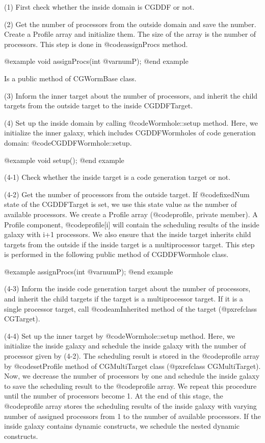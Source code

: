 {(1) First check whether the inside domain is CGDDF or not.

(2) Get the number of processors from the outside domain and save the number.
Create a Profile array and initialize them. The size of the array is the
number of processors. This step is done in @code{assignProcs} method.

@example
void assignProcs(int @var{numP});
@end example

Is a public method of CGWormBase class.

(3) Inform the inner target about the number of processors, and inherit
the child targets from the outside target to the inside CGDDFTarget.

(4) Set up the inside domain by calling @code{Wormhole::setup} method.
Here, we initialize the inner galaxy, which includes CGDDFWormholes of
code generation domain: @code{CGDDFWormhole::setup}.

@example
void setup();
@end example
 
(4-1) Check whether the inside target is a code generation target or not.

(4-2) Get the number of processors from the outside target. If @code{fixedNum}
state of the CGDDFTarget is set, we use this state value as the number of
available processors. We create a Profile array (@code{profile}, private
member). A Profile component, @code{profile[i]} will contain the scheduling
results of the inside galaxy with i+1 processors. We also ensure that
the inside target inherits child targets from the outside if the inside
target is a multiprocessor target. This step is performed in
the following public method of CGDDFWormhole class.

@example
assignProcs(int @var{numP});
@end example

(4-3) Inform the inside code generation target about the number of
processors, and inherit the child targets if the target is a multiprocessor
target. If it is a single processor target, call @code{amInherited} method
of the target (@pxref{class CGTarget}).

(4-4) Set up the inner target by @code{Wormhole::setup} method. Here, we
initialize the inside galaxy and schedule the inside galaxy with
the number of processor given by (4-2). The scheduling result is stored
in the @code{profile} array by @code{setProfile} method of CGMultiTarget
class (@pxref{class CGMultiTarget}). Now, we decrease the number of
processors by one and schedule the inside galaxy to save the scheduling
result to the @code{profile} array. We repeat this procedure until the number
of processors become 1. At the end of this stage, the @code{profile}
array stores the scheduling results of the inside galaxy with
varying number of assigned processors from 1 to the number of available
processors. If the inside galaxy contains dynamic
constructs, we schedule the nested dynamic constructs.

}
